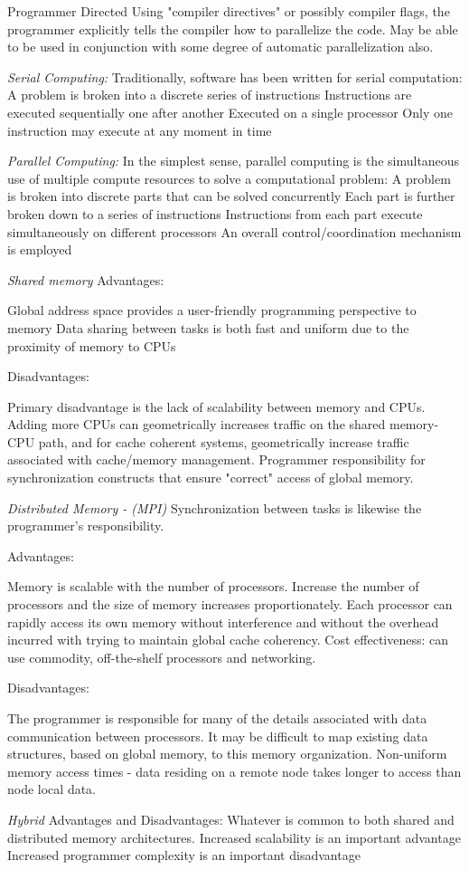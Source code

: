    Programmer Directed
        Using "compiler directives" or possibly compiler flags, the programmer explicitly tells the compiler how to parallelize the code.
        May be able to be used in conjunction with some degree of automatic parallelization also.


\emph{Serial Computing:}
    Traditionally, software has been written for serial computation:
        A problem is broken into a discrete series of instructions
        Instructions are executed sequentially one after another
        Executed on a single processor
        Only one instruction may execute at any moment in time

\emph{Parallel Computing:}
    In the simplest sense, parallel computing is the simultaneous use of multiple compute resources to solve a computational problem:
        A problem is broken into discrete parts that can be solved concurrently
        Each part is further broken down to a series of instructions
        Instructions from each part execute simultaneously on different processors
        An overall control/coordination mechanism is employed


\emph{Shared memory}
        Advantages:

            Global address space provides a user-friendly programming perspective to memory
            Data sharing between tasks is both fast and uniform due to the proximity of memory to CPUs

        Disadvantages:

            Primary disadvantage is the lack of scalability between memory and CPUs. Adding more CPUs can geometrically increases traffic on the shared memory-CPU path, and for cache coherent systems, geometrically increase traffic associated with cache/memory management.
            Programmer responsibility for synchronization constructs that ensure "correct" access of global memory.

\emph{Distributed Memory - (MPI)}
Synchronization between tasks is likewise the programmer's responsibility.

Advantages:

Memory is scalable with the number of processors. Increase the number of processors and the size of memory increases proportionately.
Each processor can rapidly access its own memory without interference and without the overhead incurred with trying to maintain global cache coherency.
Cost effectiveness: can use commodity, off-the-shelf processors and networking.

Disadvantages:

The programmer is responsible for many of the details associated with data communication between processors.
It may be difficult to map existing data structures, based on global memory, to this memory organization.
Non-uniform memory access times - data residing on a remote node takes longer to access than node local data.

\emph{Hybrid}
Advantages and Disadvantages:
  Whatever is common to both shared and distributed memory architectures.
  Increased scalability is an important advantage
  Increased programmer complexity is an important disadvantage
